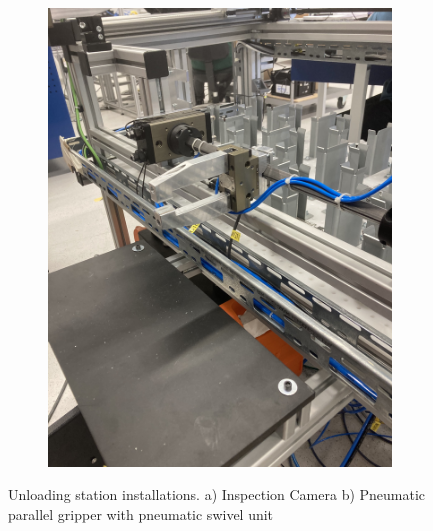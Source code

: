 \begin{enumerate}
\begin{figure}[h]
\begin{subfigure}{0.5\textwidth}
            \includegraphics[width=\textwidth, angle=-90]{figures/unloading-station-gripper.jpg} %
            \caption{}
            \label{fig:unloading-station-gripper}
        \end{subfigure}
        \caption{Unloading station installations. a) Inspection Camera b) Pneumatic parallel gripper with pneumatic swivel unit}
        \label{fig:unloading-station-installation}
    \end{figure}
    

\end{enumerate}
